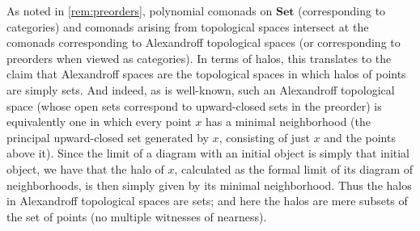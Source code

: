 \documentclass[11pt, oneside, article]{memoir}
\theoremstyle{plain}
\theoremstyle{definition}
\theoremstyle{remark}
\newenvironment{remark}
{\renewcommand\qedsymbol{$\lrcorner$}%
  \pushQED{\qed}\myremark}
{\popQED\endmyremark}
\newcommand{\dash}{{\mathord{\text{--}}}}
\newcommand{\namedcat}[1]{\mathbf{#1}}
\newcommand{\cat}[1]{\mathbf{#1}}
\newcommand{\spa}[1]{\mathbf{#1}}
\newcommand{\Halo}{\namedcat{Halo}}
\newcommand{\Set}{\namedcat{Set}}
\newcommand{\xX}{X}
\newcommand{\xY}{Y}
\newcommand{\bC}{\cat{C}}
\newcommand{\tX}{\spa{X}}
\newcommand{\neighbors}[1]{\mathcal{N}_{#1}}
\begin{document}
\begin{remark}[Categories]

  As noted in \cref{rem:preorders}, polynomial comonads on $\Set$
  (corresponding to categories) and comonads arising from topological
  spaces intersect at the comonads corresponding to Alexandroff
  topological spaces (or corresponding to preorders when viewed as
  categories). In terms of halos, this translates to the claim that
  Alexandroff spaces are the topological spaces in which halos of
  points are simply sets. And indeed, as is well-known, such an
  Alexandroff topological space (whose open sets correspond to
  upward-closed sets in the preorder) is equivalently one in which
  every point $x$ has a minimal neighborhood (the principal
  upward-closed set generated by $x$, consisting of just $x$ and the
  points above it). Since the limit of a diagram with an initial
  object is simply that initial object, we have that the halo of $x$,
  calculated as the formal limit of its diagram of neighborhoods, is
  then simply given by its minimal neighborhood. Thus the halos in
  Alexandroff topological spaces are sets; and here the halos are mere
  subsets of the set of points (no multiple witnesses of nearness).
\end{remark}
\end{document}

